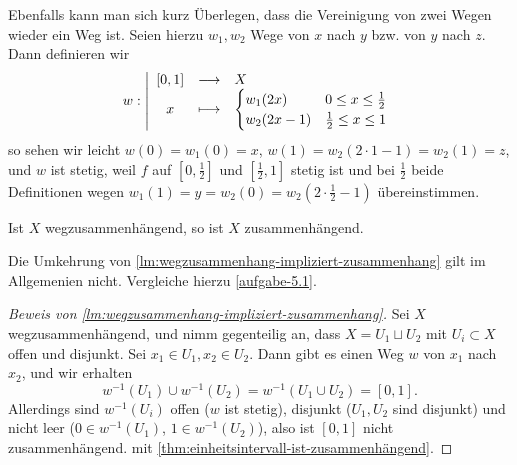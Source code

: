 \begin{remark*}
    Ebenfalls kann man sich kurz Überlegen, dass die Vereinigung von zwei Wegen wieder ein Weg ist. Seien hierzu $w_1,w_2$ Wege von $x$ nach  $y$ bzw. von  $y$ nach  $z$. Dann definieren  wir
        \begin{equation*}
        w: \left| \begin{array}{c c l} 
            [0,1] & \longrightarrow & X \\
        x & \longmapsto &  \begin{cases}
            w_1(2x) & 0\leq x\leq \frac{1}{2} \\
            w_2(2x-1) & \frac{1}{2} \leq  x \leq  1
        \end{cases}
        \end{array} \right.
    \end{equation*}
    so sehen wir leicht $w(0) = w_1(0) = x$, $w(1) = w_2(2\cdot 1-1) = w_2(1) = z$, und $w$ ist stetig, weil $f$ auf  $[0,\frac{1}{2}]$ und $[\frac{1}{2},1]$  stetig ist und bei $\frac{1}{2}$ beide Definitionen wegen $w_1(1) = y = w_2(0) = w_2(2\cdot \frac{1}{2}-1)$ übereinstimmen.
\end{remark*}

\begin{lemma}\label{lm:wegzusammenhang-impliziert-zusammenhang}
    Ist $X$ wegzusammenhängend, so ist  $X$ zusammenhängend.
\end{lemma}

\begin{warning}
    Die Umkehrung von \autoref{lm:wegzusammenhang-impliziert-zusammenhang} gilt im Allgemenien nicht. Vergleiche hierzu \autoref{aufgabe-5.1}.
\end{warning}

\begin{proof}[Beweis von \autoref{lm:wegzusammenhang-impliziert-zusammenhang}]
    Sei $X$ wegzusammenhängend, und nimm gegenteilig an, dass  $X = U_1 \sqcup U_2$ mit $U_i \subset X$ offen und disjunkt. Sei $x_1 \in U_1, x_2\in U_2$. Dann gibt es einen Weg $w$ von  $x_1$ nach $x_2$, und  wir erhalten
    \[
        w^{-1}(U_1) \cup w^{-1}(U_2) = w^{-1}(U_1\cup U_2) = [0,1]
    .\] 
    Allerdings sind $w^{-1}(U_i)$ offen ($w$ ist stetig), disjunkt ($U_1,U_2$ sind disjunkt) und nicht leer ($0\in w^{-1}(U_1)$, $1\in w^{-1}(U_2)$), also ist $[0,1]$ nicht zusammenhängend. \contra mit \autoref{thm:einheitsintervall-ist-zusammenhängend}.
\end{proof}


